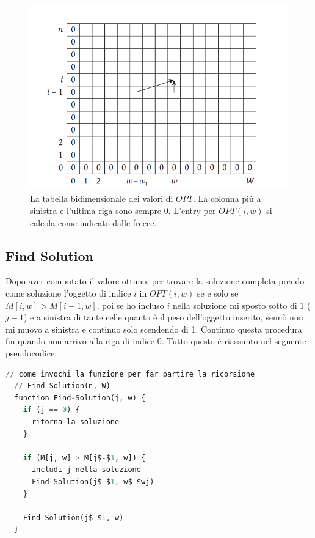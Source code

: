 \begin{figure}[H]
  \centering
  \includegraphics[width=\textwidth, keepaspectratio]{capitoli/programmazione_dinamica/imgs/knapsack_opt.png}
  \caption{La tabella bidimensionale dei valori di $OPT$.
    La colonna più a sinistra e l'ultima riga sono sempre 0. L'entry
    per $OPT(i, w)$ si calcola come indicato dalle frecce.}
\end{figure}


\subsection{Find Solution}

Dopo aver computato il valore ottimo, per trovare la soluzione completa
prendo come soluzione l'oggetto di indice $i$ in $OPT(i, w)$ se e solo se
$M[i, w] > M[i-1, w]$,
poi se ho incluso $i$ nella soluzione mi sposto sotto di 1 ($j-1$) e a
sinistra di tante celle quanto è il peso dell'oggetto inserito, sennò non
mi muovo a sinistra e continuo solo scendendo di 1. Continuo questa
procedura fin quando non arrivo alla riga di indice 0. Tutto questo è
riassunto nel seguente pseudocodice.
\newpage
\begin{lstlisting}[language=Python, mathescape=true]
  // come invochi la funzione per far partire la ricorsione
  // Find-Solution(n, W)
  function Find-Solution(j, w) {
    if (j == 0) {
      ritorna la soluzione
    }
  
    if (M[j, w] > M[j$-$1, w]) {
      includi j nella soluzione 
      Find-Solution(j$-$1, w$-$wj)
    }
  
    Find-Solution(j$-$1, w)
  }
\end{lstlisting}

